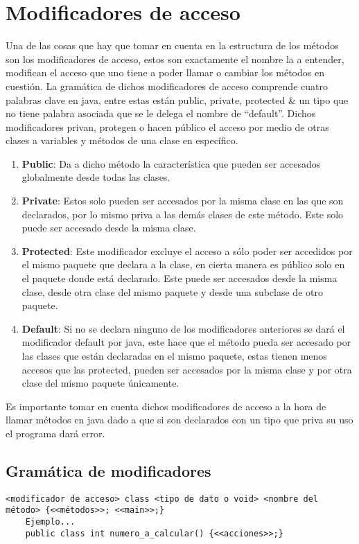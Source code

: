 \documentclass{article}
\begin{document}
\section{Modificadores de acceso}
Una de las cosas que hay que tomar en cuenta en la estructura de los métodos son los modificadores de acceso, estos son exactamente el nombre la a entender, modifican el acceso que uno tiene a poder llamar o cambiar los métodos en cuestión. La gramática de dichos modificadores de acceso comprende cuatro palabras clave en java, entre estas están public, private, protected \& un tipo que no tiene palabra asociada que se le delega el nombre de ``default''. Dichos modificadores privan, protegen o hacen público el acceso por medio de otras clases a variables y métodos de una clase en específico.
\begin{enumerate}
    \item \textbf{Public}: Da a dicho método la característica que pueden ser accesados globalmente desde todas las clases.
    \item \textbf{Private}: Estos solo pueden ser accesados por la misma clase en las que son declarados, por lo mismo priva a las demás clases de este método. Este solo puede ser accesado desde la misma clase.
    \item \textbf{Protected}: Este modificador excluye el acceso a sólo poder ser accedidos por el mismo paquete que declara a la clase, en cierta manera es público solo en el paquete donde está declarado. Este puede ser accesados desde la misma clase, desde otra clase del mismo paquete y desde una subclase de otro paquete.
    \item \textbf{Default}: Si no se declara ninguno de los modificadores anteriores se dará el modificador default por java, este hace que el método pueda ser accesado por las clases que están declaradas en el mismo paquete, estas tienen menos accesos que las protected, pueden ser accesados por la misma clase y por otra clase del mismo paquete únicamente. 
\end{enumerate}
Es importante tomar en cuenta dichos modificadores de acceso a la hora de llamar métodos en java dado a que si son declarados con un tipo que priva su uso el programa dará error. \newline 
\subsection{Gramática de modificadores}
\begin{Verbatim}[breaklines=true, breakanywhere=true]
    <modificador de acceso> class <tipo de dato o void> <nombre del método> {<<métodos>>; <<main>>;}    
    Ejemplo...
    public class int numero_a_calcular() {<<acciones>>;}
\end{Verbatim}
\end{document}
